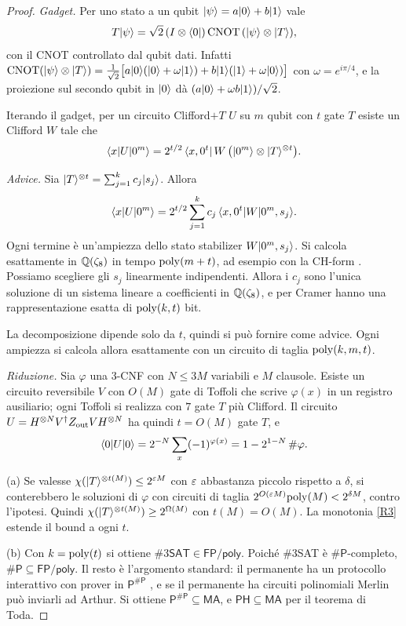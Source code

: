 \begin{proof}
\emph{Gadget.} Per uno stato a un qubit $\lvert \psi\rangle=a\lvert 0\rangle+b\lvert 1\rangle$ vale
\[
T\lvert \psi\rangle=\sqrt2\,(I\otimes\langle 0\rvert)\,\mathrm{CNOT}\,(\lvert \psi\rangle\otimes\lvert T\rangle),
\]
con il CNOT controllato dal qubit dati. Infatti $\mathrm{CNOT}(\lvert \psi\rangle\otimes\lvert T\rangle)=\frac{1}{\sqrt2}\bigl[a\lvert 0\rangle(\lvert 0\rangle+\omega\lvert 1\rangle)+b\lvert 1\rangle(\lvert 1\rangle+\omega\lvert 0\rangle)\bigr]$ con $\omega=e^{i\pi/4}$, e la proiezione sul secondo qubit in $\lvert 0\rangle$ dà $(a\lvert 0\rangle+\omega b\lvert 1\rangle)/\sqrt2$.

Iterando il gadget, per un circuito Clifford$+T$ $U$ su $m$ qubit con $t$ gate $T$ esiste un Clifford $W$ tale che
\[
\langle x\rvert U\lvert 0^m\rangle=2^{t/2}\,\langle x,0^t\rvert\,W\,\bigl(\lvert 0^m\rangle\otimes\lvert T\rangle^{\otimes t}\bigr).
\]

\emph{Advice.} Sia $\lvert T\rangle^{\otimes t}=\sum_{j=1}^kc_j\lvert s_j\rangle$. Allora
\[
\langle x\rvert U\lvert 0^m\rangle=2^{t/2}\sum_{j=1}^k c_j\,\langle x,0^t\rvert W\lvert 0^m,s_j\rangle.
\]
Ogni termine è un'ampiezza dello stato stabilizer $W\lvert 0^m,s_j\rangle$. Si calcola esattamente in $\mathbb Q(\zeta_8)$ in tempo $\mathrm{poly}(m+t)$, ad esempio con la CH-form \cite{BBCCGH19}. Possiamo scegliere gli $s_j$ linearmente indipendenti. Allora i $c_j$ sono l'unica soluzione di un sistema lineare a coefficienti in $\mathbb Q(\zeta_8)$, e per Cramer hanno una rappresentazione esatta di $\mathrm{poly}(k,t)$ bit.

La decomposizione dipende solo da $t$, quindi si può fornire come advice. Ogni ampiezza si calcola allora esattamente con un circuito di taglia $\mathrm{poly}(k,m,t)$.

\emph{Riduzione.} Sia $\varphi$ una 3-CNF con $N\le 3M$ variabili e $M$ clausole. Esiste un circuito reversibile $V$ con $O(M)$ gate di Toffoli che scrive $\varphi(x)$ in un registro ausiliario; ogni Toffoli si realizza con $7$ gate $T$ più Clifford. Il circuito $U=H^{\otimes N}V^\dagger Z_{\rm out}VH^{\otimes N}$ ha quindi $t=O(M)$ gate $T$, e
\[
\langle 0\rvert U\lvert 0\rangle=2^{-N}\sum_x(-1)^{\varphi(x)}=1-2^{1-N}\,\#\varphi .
\]

(a) Se valesse $\chi(\lvert T\rangle^{\otimes t(M)})\le 2^{\varepsilon M}$ con $\varepsilon$ abbastanza piccolo rispetto a $\delta$, si conterebbero le soluzioni di $\varphi$ con circuiti di taglia $2^{O(\varepsilon M)}\mathrm{poly}(M)<2^{\delta M}$, contro l'ipotesi. Quindi $\chi(\lvert T\rangle^{\otimes t(M)})\ge 2^{\Omega(M)}$ con $t(M)=O(M)$. La monotonia \ref{R3} estende il bound a ogni $t$.

(b) Con $k=\mathrm{poly}(t)$ si ottiene $\#3\mathsf{SAT}\in\mathsf{FP/poly}$. Poiché \#3SAT è $\#\mathsf P$-completo, $\#\mathsf P\subseteq\mathsf{FP/poly}$. Il resto è l'argomento standard: il permanente ha un protocollo interattivo con prover in $\mathsf P^{\#\mathsf P}$ \cite{LFKN92}, e se il permanente ha circuiti polinomiali Merlin può inviarli ad Arthur. Si ottiene $\mathsf P^{\#\mathsf P}\subseteq\mathsf{MA}$, e $\mathsf{PH}\subseteq\mathsf{MA}$ per il teorema di Toda.
\end{proof}

